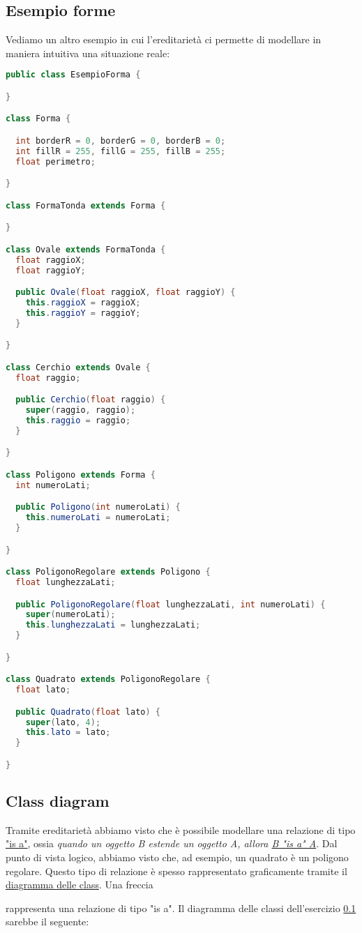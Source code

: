 \subsection{Esempio forme}\label{EsempioForme}
Vediamo un altro esempio in cui l'ereditarietà ci permette di modellare in maniera intuitiva una situazione reale:
\vskip3mm

\begin{lstlisting}[language = java, frame = none]
public class EsempioForma {

}

class Forma {

  int borderR = 0, borderG = 0, borderB = 0;
  int fillR = 255, fillG = 255, fillB = 255;
  float perimetro;

}

class FormaTonda extends Forma {

}

class Ovale extends FormaTonda {
  float raggioX;
  float raggioY;

  public Ovale(float raggioX, float raggioY) {
    this.raggioX = raggioX;
    this.raggioY = raggioY;
  }

}

class Cerchio extends Ovale {
  float raggio;

  public Cerchio(float raggio) {
    super(raggio, raggio);
    this.raggio = raggio;
  }

}

class Poligono extends Forma {
  int numeroLati;

  public Poligono(int numeroLati) {
    this.numeroLati = numeroLati;
  }

}

class PoligonoRegolare extends Poligono {
  float lunghezzaLati;

  public PoligonoRegolare(float lunghezzaLati, int numeroLati) {
    super(numeroLati);
    this.lunghezzaLati = lunghezzaLati;
  }

}

class Quadrato extends PoligonoRegolare {
  float lato;

  public Quadrato(float lato) {
    super(lato, 4);
    this.lato = lato;
  }

}
\end{lstlisting}

\subsection{Class diagram}
Tramite ereditarietà abbiamo visto che è possibile modellare una relazione di tipo \underline{"is a"}, ossia \textit{quando un oggetto B estende un oggetto A, allora \underline{B "is a" A}}. Dal punto di vista logico, abbiamo visto che, ad esempio, un quadrato è un poligono regolare. Questo tipo di relazione è spesso rappresentato graficamente tramite il \underline{diagramma delle class}. Una freccia 
rappresenta una relazione di tipo "is a". Il diagramma delle classi dell'esercizio \ref{EsempioForme} sarebbe il seguente:

